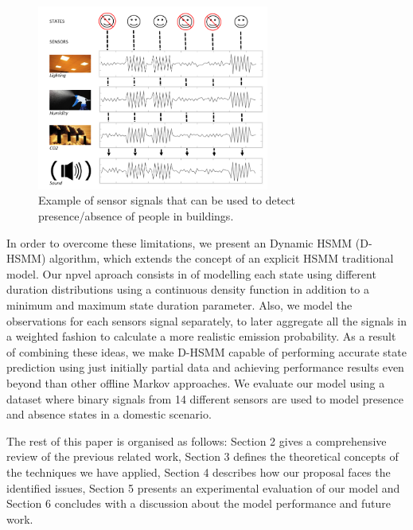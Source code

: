 \documentclass[conference]{IEEEtran}
\begin{document}
\begin{figure}[!t]
	\centering
	\includegraphics[width=3in]{sensorsignals.png}
	
	\caption{Example of sensor signals that can be used to detect presence/absence of people in buildings.}
	\label{fig5}
\end{figure}



In order to overcome these limitations, we present an  Dynamic HSMM (D-HSMM) algorithm, which extends the concept of an explicit HSMM traditional model. Our npvel aproach consists in of modelling each state using different duration distributions using a continuous density function in addition to a minimum and maximum state duration parameter. Also, we model the observations for each sensors signal separately, to later aggregate all the signals in a weighted fashion to calculate a more realistic emission probability. As a result of combining these ideas, we make D-HSMM capable of performing accurate state prediction using just initially partial data and achieving performance results even beyond than other offline Markov approaches. We evaluate our model using a dataset where binary signals from 14 different sensors are used to model presence and absence states in a domestic scenario.

The rest of this paper is organised as follows: Section 2 gives a comprehensive review of the previous related work, Section 3 defines the theoretical concepts of the techniques we have applied, Section 4 describes how our proposal faces the identified issues, Section 5 presents an experimental evaluation of our model and Section 6 concludes with a discussion about the model performance and future work.

%	
\end{document}
